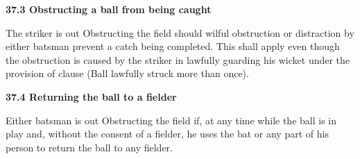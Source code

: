 \documentclass[12pt]{article}
\begin{document}
\vspace{\baselineskip}
{\fontsize{11pt}{13.2pt}\selectfont \textbf{37.3 \tabto{0.47in} Obstructing a ball from being caught}\par}\par


\vspace{\baselineskip}
\begin{adjustwidth}{0.0in}{0.06in}
\begin{justify}
{\fontsize{9pt}{10.8pt}\selectfont The striker is out Obstructing the field should wilful obstruction or distraction by either batsman prevent a catch being completed. This shall apply even though the obstruction is caused by the striker in lawfully guarding his wicket under the provision of clause (Ball lawfully struck more than once).\par}
\end{justify}\par

\end{adjustwidth}


\vspace{\baselineskip}

\vspace{\baselineskip}

\vspace{\baselineskip}

\vspace{\baselineskip}

\vspace{\baselineskip}
\begin{Center}
{\fontsize{8pt}{9.6pt}\par}
\end{Center}\par


\vspace{\baselineskip}
{\fontsize{11pt}{13.2pt}\selectfont \textbf{37.4 \tabto{0.47in} Returning the ball to a fielder}\par}\par


\vspace{\baselineskip}
\begin{adjustwidth}{0.0in}{0.08in}
{\fontsize{9pt}{10.8pt}\selectfont Either batsman is out Obstructing the field if, at any time while the ball is in play and, without the consent of a fielder, he uses the bat or any part of his person to return the ball to any fielder.\par}\par

\end{adjustwidth}
\end{document}
